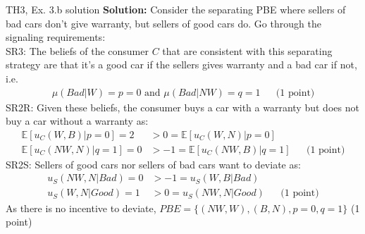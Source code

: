 




\begin{frame}{TH3, Ex. 3.b solution}
  \textbf{Solution:} Consider the separating PBE where sellers of bad cars don't give warranty, but sellers of good cars do. Go through the signaling requirements:\\\smallskip
  SR3: The beliefs of the consumer $C$ that are consistent with this separating strategy are that it's a good car if the sellers gives warranty and a bad car if not, i.e.
  \begin{align*}
    \mu(Bad|W)=p=0\text{ and }\mu(Bad|NW)=q=1&&\text{(1 point)}
  \end{align*}
  SR2R: Given these beliefs, the consumer buys a car with a warranty but does not buy a car without a warranty as:
  \begin{align*}
    \mathbb{E}[u_C(W,B)|p=0]=2&>0=\mathbb{E}[u_C(W,N)|p=0]\\
    \mathbb{E}[u_C(NW,N)|q=1]=0&>-1=\mathbb{E}[u_C(NW,B)|q=1]&&\text{(1 point)}
  \end{align*}
  SR2S: Sellers of good cars nor sellers of bad cars want to deviate as:
  \begin{align*}
    u_S(NW,N|Bad)=0&>-1=u_S(W,B|Bad)\\
    u_S(W,N|Good)=1&>0=u_S(NW,N|Good)&&\text{(1 point)}
  \end{align*}
  As there is no incentive to deviate, $PBE=\{(NW,W),(B,N),p=0,q=1\}$ (1 point)
\end{frame}




